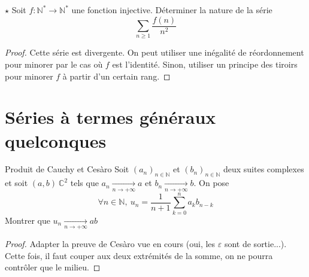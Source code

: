 \documentclass[french,a4paper]{article}
\newcommand{\N}{\mathbb{N}}
\newcommand{\C}{\mathbb{C}}
\newcommand{\st}{^*}
\theoremstyle{plain}
\theoremstyle{definition}
\theoremstyle{remark}
\begin{document}
\begin{ex}[Morlot]{$\star$}
	Soit $f:\N\st\to\N\st$ une fonction injective. Déterminer la nature de la série $$\sum_{n\geqslant 1}\frac{f(n)}{n^2}$$
\end{ex}

\begin{proof}
	Cette série est divergente. On peut utiliser une inégalité de réordonnement pour minorer par le cas où $f$ est l'identité. Sinon, utiliser un principe des tiroirs pour minorer $f$ à partir d'un certain rang. 
\end{proof}

\section{Séries à termes généraux quelconques}

\begin{ex}{Produit de Cauchy et Cesàro}
	Soit $(a_n)_{n \in\N}$ et $(b_n)_{n \in\N}$ deux suites complexes et soit $(a,b) \ \C^2$ tels que $a_n \underset{n \longrightarrow + \infty}{\longrightarrow} a $ et $b_n \underset{n \longrightarrow + \infty}{\longrightarrow} b $. On pose $$\forall n \in \N, \ u_n = \frac{1}{n+1}\sum_{k=0}^{n}a_k b_{n-k} $$ Montrer que $u_n \xrightarrow[n\to+\infty]{} ab$
\end{ex}
\begin{proof}
	Adapter la preuve de Cesàro vue en cours (oui, les $\varepsilon$ sont de sortie...). Cette fois, il faut couper aux deux extrémités de la somme, on ne pourra contrôler que le milieu.
\end{proof}
\end{document}
